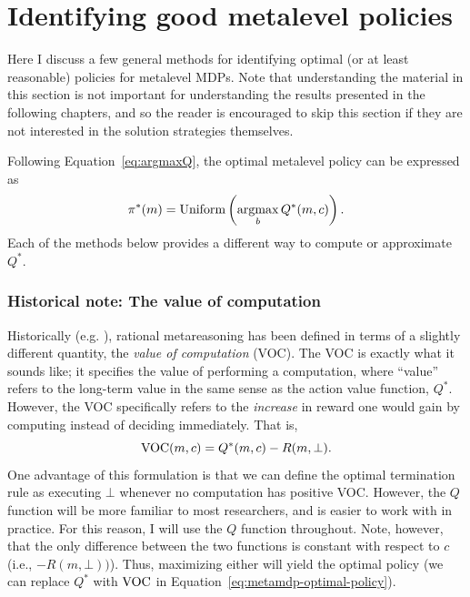\section{Identifying good metalevel policies}\label{sec:computing}

Here I discuss a few general methods for identifying optimal (or at least reasonable) policies for metalevel MDPs. Note that understanding the material in this section is not important for understanding the results presented in the following chapters, and so the reader is encouraged to skip this section if they are not interested in the solution strategies themselves.

Following Equation~\ref{eq:argmaxQ}, the optimal metalevel policy can be expressed as
%
\begin{equation}\label{eq:metamdp-optimal-policy}
  \pi^*(m) = \mathrm{Uniform}\left(\operatorname*{argmax}_b Q^*(m, c)\right).
\end{equation}
Each of the methods below provides a different way to compute or approximate $Q^*$.

\subsubsection{Historical note: The value of computation}

Historically (e.g. \citealp{russell1991principles}), rational metareasoning has been defined in terms of a slightly different quantity, the \emph{value of computation} (VOC). The VOC is exactly what it sounds like; it specifies the value of performing a computation, where ``value'' refers to the long-term value in the same sense as the action value function, $Q^*$. However, the VOC specifically refers to the \emph{increase} in reward one would gain by computing instead of deciding immediately. That is,
\begin{equation}
  \text{VOC}(m, c) = Q^*(m, c) - R(m, \bot).
\end{equation}
One advantage of this formulation is that we can define the optimal termination rule as executing $\bot$ whenever no computation has positive VOC. However, the $Q$ function will be more familiar to most researchers, and is easier to work with in practice. For this reason, I will use the $Q$ function throughout. Note, however, that the only difference between the two functions is constant with respect to $c$ (i.e., $-R(m, \bot))$). Thus, maximizing either will yield the optimal policy (we can replace $Q^*$ with $\text{VOC}$ in Equation~\ref{eq:metamdp-optimal-policy}).

